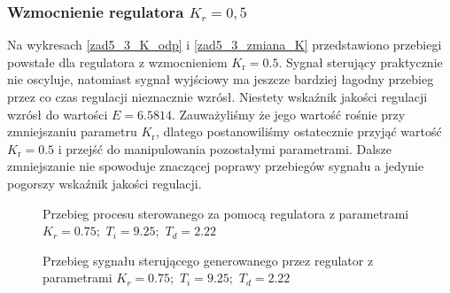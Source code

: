 \subsubsection{Wzmocnienie regulatora $K_{r}=0,5$}
Na wykresach \ref{zad5_3_K_odp} i \ref{zad5_3_zmiana_K} przedstawiono przebiegi powstałe 
dla regulatora z wzmocnieniem $ K_{\mathrm{r}} = \num{0,5}$. Sygnał sterujący praktycznie nie
oscyluje, natomiast sygnał wyjściowy ma jeszcze bardziej łagodny przebieg przez co czas regulacji 
nieznacznie wzrósł. Niestety wskaźnik jakości 
regulacji wzrósł do wartości $E=\num{6,5814}$. Zauważyliśmy że jego wartość rośnie przy zmniejszaniu  
parametru $ K_{\mathrm{r}}$, dlatego postanowiliśmy 
ostatecznie przyjąć wartość $K_{\mathrm{r}} = \num{0,5}$ i przejść do manipulowania 
pozostałymi parametrami. Dalsze zmniejszanie nie spowoduje 
znaczącej poprawy przebiegów sygnału a jedynie pogorszy wskaźnik jakości regulacji. 


\begin{figure}[t]
    \centering
    \caption{Przebieg procesu sterowanego za pomocą regulatora z 
    parametrami \mbox{$K_{r} = \num{0,75}$; $T_{i} = \num{9,25}$; $T_{d} = \num{2,22}$}}
    \label{zad5_1_K_odp}
\end{figure}

\begin{figure}[b]
    \centering
    \caption{Przebieg sygnału sterującego generowanego przez regulator z 
    parametrami \mbox{$K_{r} = \num{0,75}$; $T_{i} = \num{9,25}$; $T_{d} = \num{2,22}$}}
    \label{zad5_1_zmiana_K}
\end{figure}
\FloatBarrier

